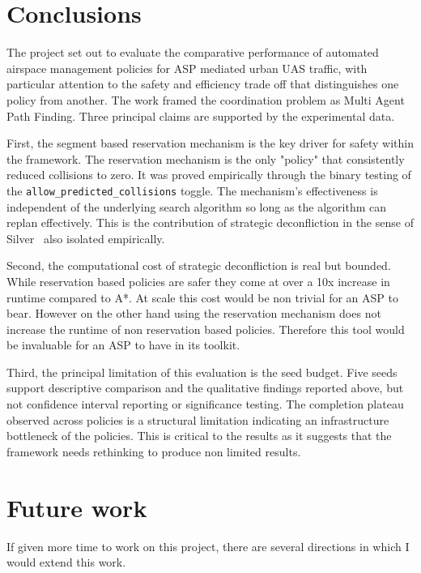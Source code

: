 \section{Conclusions}
\label{sec:results-conclusions}

The project set out to evaluate the comparative performance of automated airspace management policies for ASP mediated urban UAS traffic, with particular attention to the safety and efficiency trade off that distinguishes one policy from another. The work framed the coordination problem as Multi Agent Path Finding. Three principal claims are supported by the experimental data.

First, the segment based reservation mechanism is the key driver for safety within the framework. The reservation mechanism is the only "policy" that consistently reduced collisions to zero. It was proved empirically through the binary testing of the \texttt{allow\_predicted\_collisions} toggle. The mechanism's effectiveness is independent of the underlying search algorithm so long as the algorithm can replan effectively. This is the contribution of strategic deconfliction in the sense of Silver~\cite{silver2005cooperative} also isolated empirically.

Second, the computational cost of strategic deconfliction is real but bounded. While reservation based policies are safer they come at over a 10x increase in runtime compared to A*. At scale this cost would be non trivial for an ASP to bear. However on the other hand using the reservation mechanism does not increase the runtime of non reservation based policies. Therefore this tool would be invaluable for an ASP to have in its toolkit.

Third, the principal limitation of this evaluation is the seed budget. Five seeds support descriptive comparison and the qualitative findings reported above, but not confidence interval reporting or significance testing. The completion plateau observed across policies is a structural limitation indicating an infrastructure bottleneck of the policies. This is critical to the results as it suggests that the framework needs rethinking to produce non limited results. 


\section{Future work}
\label{sec:future-work}

If given more time to work on this project, there are several directions in which I would extend this work.\par

